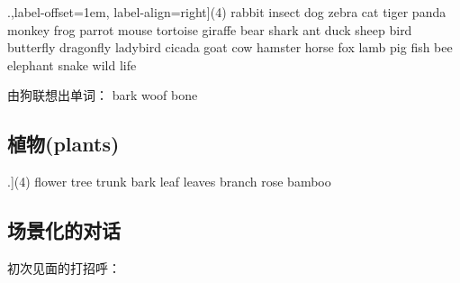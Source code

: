 \documentclass[a4paper]{article}
\begin{document}
{              
                       


\begin{tasks}[counter-format=tsk[1].,label-offset=1em, label-align=right](4)
 \task rabbit  \task insect \task dog     \task zebra
 \task cat     \task tiger  \task panda   \task monkey
 \task frog    \task parrot \task mouse   \task tortoise
 \task giraffe \task bear   \task shark   \task ant
 \task duck    \task sheep  \task bird  
 \task butterfly \task dragonfly \task ladybird \task cicada
 \task goat     \task cow  \task hamster  \task horse
 \task fox     \task lamb  \task pig      \task fish
 \task bee     \task elephant \task snake  \task wild life
\end{tasks}

由狗联想出单词： \qquad bark  \qquad woof  \qquad bone                                             

  \subsection{植物(plants)}               
  
\begin{tasks}[counter-format=tsk[1].](4)
 \task flower \task tree \task trunk \task bark
 \task leaf  \task leaves  \task branch  \task rose
 \task bamboo
\end{tasks}

  \subsection{场景化的对话}
初次见面的打招呼：               

}
\end{document}
